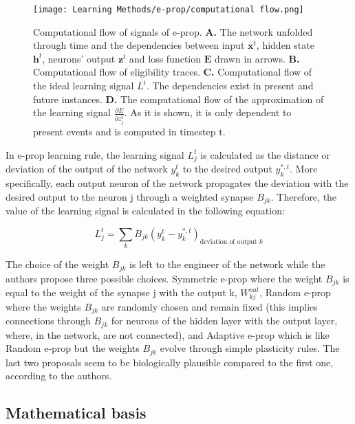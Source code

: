 \documentclass[12pt]{report}
\begin{document}
\begin{figure}[htp]
    \centering
    \texttt{[image: Learning Methods/e-prop/computational flow.png]}
    \caption{\footnotesize Computational flow of signals of e-prop. \textbf{A. } The network unfolded through time and the dependencies between input \(\textbf{x}^t\), hidden state \(\textbf{h}^t\), neurons' output \(\textbf{z}^t\) and loss function \(\textbf{E}\) drawn in arrows. \textbf{B. } Computational flow of eligibility traces. \textbf{C. } Computational flow of the ideal learning signal \(L^t\). The dependencies exist in present and future instances. \textbf{D. } The computational flow of the approximation of the learning signal \(\frac{\partial E}{\partial z_{j}^{t}}\). As it is shown, it is only dependent to present events and is computed in timestep t.
    \label{fig:readout}}
\end{figure}

In e-prop learning rule, the learning signal \(L_j^t\) is calculated as the distance or deviation of the output of the network \(y^t_k\) to the desired output \(y^{*,t}_k\). More specifically, each output neuron of the network propagates the deviation with the desired output to the neuron j through a weighted synapse \(B_{jk}\). Therefore, the value of the learning signal is calculated in the following equation:

\begin{equation}
    L_{j}^{t}=\sum_{k} B_{j k}\left(y_{k}^{t}-y_{k}^{*, t}\right)_{\text {deviation of output } k}
\end{equation}

The choice of the weight \(B_{jk}\) is left to the engineer of the network while the authors propose three possible choices. Symmetric e-prop where the weight \(B_{jk}\) is equal to the weight of the synapse j with the output k, \(W_{kj}^{out}\), Random e-prop where the weights \(B_{jk}\) are randomly chosen and remain fixed (this implies connections through \(B_{jk}\) for neurons of the hidden layer with the output layer, where, in the network, are not connected), and Adaptive e-prop which is like Random e-prop but the weights \(B_{jk}\) evolve through simple plasticity rules. The last two proposals seem to be biologically plausible compared to the first one, according to the authors.

\subsection{Mathematical basis}
\end{document}
